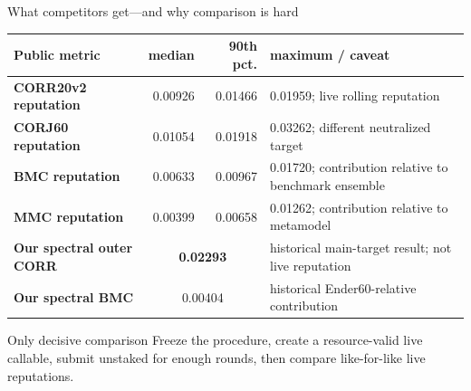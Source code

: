 \documentclass[aspectratio=169,10pt]{beamer}
\begin{document}
\begin{frame}{What competitors get—and why comparison is hard}
  \small
  \begin{tabular}{>{\bfseries}p{3.0cm}rrp{5.0cm}}
    \toprule
    Public metric & median & 90th pct. & maximum / caveat \\
    \midrule
    CORR20v2 reputation & 0.00926 & 0.01466 & 0.01959; live rolling reputation \\
    CORJ60 reputation & 0.01054 & 0.01918 & 0.03262; different neutralized target \\
    BMC reputation & 0.00633 & 0.00967 & 0.01720; contribution relative to benchmark ensemble \\
    MMC reputation & 0.00399 & 0.00658 & 0.01262; contribution relative to metamodel \\
    \midrule
    Our spectral outer CORR & \multicolumn{2}{c}{\textbf{0.02293}} & historical main-target result; not live reputation \\
    Our spectral BMC & \multicolumn{2}{c}{0.00404} & historical Ender60-relative contribution \\
    \bottomrule
  \end{tabular}
  \vspace{0.8em}
  \begin{block}{Only decisive comparison}
    Freeze the procedure, create a resource-valid live callable, submit unstaked for enough rounds, then compare like-for-like live reputations.
  \end{block}
\end{frame}
\end{document}
